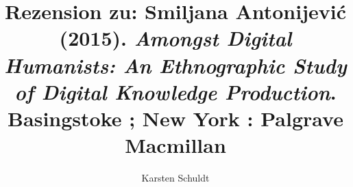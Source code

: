 
\fancyhead[R]{\thepage} %

\title{\LARGE{Rezension zu: Smiljana Antonijević (2015). \emph{Amongst Digital Humanists: An Ethnographic Study of Digital Knowledge Production}. Basingstoke ; New York : Palgrave Macmillan}} %
\author{Karsten Schuldt} %

\setcounter{page}{1}